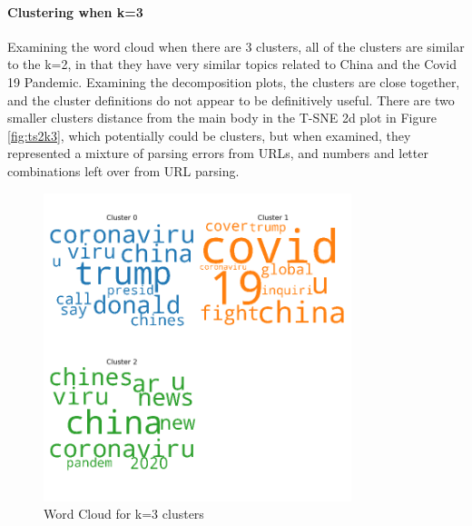 \paragraph{Clustering when k=3} 
Examining the word cloud when there are 3 clusters, all of the clusters are similar to the k=2, in that they have very similar topics related to China and the Covid 19 Pandemic. Examining the decomposition plots, the clusters are close together, and the cluster definitions do not appear to be definitively useful. There are two smaller clusters distance from the main body in the T-SNE 2d plot in Figure \ref{fig:ts2k3}, which potentially could be clusters, but when examined, they represented a mixture of parsing errors from URLs, and numbers and letter combinations left over from URL parsing.  
\begin{figure}[H]
	\centering
	\includegraphics[width=0.8\textwidth]{images/kmeans_word_cloud_k=3.png}
	\caption{Word Cloud for k=3 clusters}
	\label{fig:wck3}
\end{figure}

